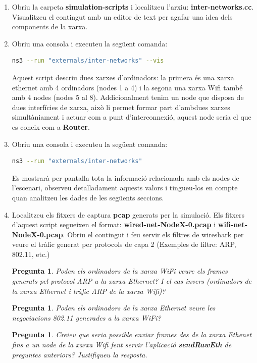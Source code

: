 \documentclass[12pt,a4paper]{article}
\newcounter{exercises}
\newtheorem{exer}[exercises]{Pregunta}
\begin{document}
\begin{enumerate} 
 \item Obriu la carpeta \textbf{simulation-scripts} i localitzeu l'arxiu: \textbf{inter-networks.cc}. Visualitzeu el contingut amb un editor de text per agafar una idea dels components de la xarxa.
  
\item Obriu una consola i executeu la següent comanda:
\begin{lstlisting}[language=bash]
   ns3 --run "externals/inter-networks" --vis
\end{lstlisting}

Aquest script descriu dues xarxes d'ordinadors: la primera és una xarxa ethernet amb 4 ordinadors (nodes 1 a 4) i la segona una xarxa Wifi també amb 4 nodes (nodes 5 al 8).
Addicionalment tenim un node que disposa de dues interfícies de xarxa, això li permet formar part d'ambdues xarxes simultàniament i actuar com a punt d'interconnexió, aquest node seria el que es coneix com a \textbf{Router}.


\item Obriu una consola i executeu la següent comanda:
\begin{lstlisting}[language=bash]
   ns3 --run "externals/inter-networks"
\end{lstlisting}
Es mostrarà per pantalla tota la informació relacionada amb els nodes de l'escenari, observeu
detalladament aquests valors i tingueu-los en compte quan analitzeu les dades de les següents seccions.

\item Localitzeu els fitxers de captura \textbf{pcap} generats per la simulació. Els fitxers d'aquest script segueixen el format: \textbf{wired-net-NodeX-0.pcap} i \textbf{wifi-net-NodeX-0.pcap}.
Obriu el contingut i feu servir els filtres de wireshark per veure el tràfic generat per protocols de capa 2 (Exemples de filtre: ARP, 802.11, etc.)

\begin{exer}
Poden els ordinadors de la xarxa WiFi veure els frames generats pel protocol ARP a la xarxa Ethernet? I el cas invers (ordinadors de la xarxa Ethernet i tràfic ARP de la xarxa Wifi)?\end{exer}
\begin{exer} Poden els ordinadors de la xarxa Ethernet veure les negociacions 802.11 generades a la xarxa WiFi?
\end{exer}
\begin{exer}
Creieu que seria possible enviar frames des de la xarxa Ethenet fins a un node de la xarxa Wifi fent servir l'aplicació \textbf{sendRawEth} de preguntes anteriors? Justifiqueu la resposta.
\end{exer}


\end{enumerate}
\end{document}
